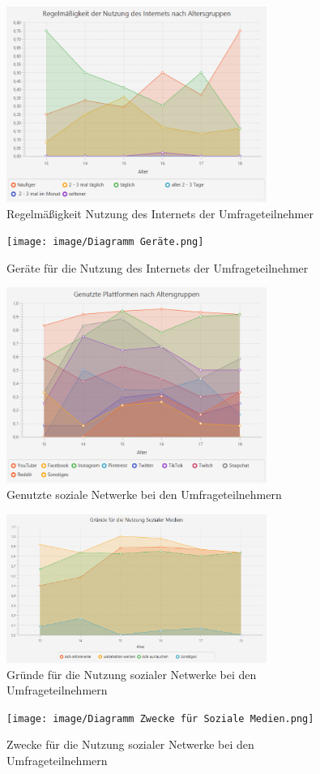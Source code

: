 \begin{figure}[ht]
    \centering
    \includegraphics[width=8.5cm]{image/Diagramm Regelmäßigkeit der Nutzung.png}
    \caption{\label{imgs:diagramm_regelmaessigkeit}Regelmäßigkeit Nutzung des Internets der Umfrageteilnehmer}
\end{figure}

\begin{figure}[ht]
    \centering
    \texttt{[image: image/Diagramm Geräte.png]}
    \caption{\label{imgs:diagramm_geraete}Geräte für die Nutzung des Internets der Umfrageteilnehmer}
\end{figure}

\begin{figure}[ht]
    \centering
    \includegraphics[width=8.5cm]{image/Diagramm Genutzte Plattformen.png}
    \caption{\label{imgs:diagramm_plattformen}Genutzte soziale Netwerke bei den Umfrageteilnehmern}
\end{figure}

\begin{figure}[ht]
    \centering
    \includegraphics[width=8.5cm]{image/Diagramm Gründe für Soziale Medien.png}
    \caption{\label{imgs:diagramm_gruende}Gründe für die Nutzung sozialer Netwerke bei den Umfrageteilnehmern}
\end{figure}

\begin{figure}[ht]
    \centering
    \texttt{[image: image/Diagramm Zwecke für Soziale Medien.png]}
    \caption{\label{imgs:diagramm_zwecke}Zwecke für die Nutzung sozialer Netwerke bei den Umfrageteilnehmern}
\end{figure}